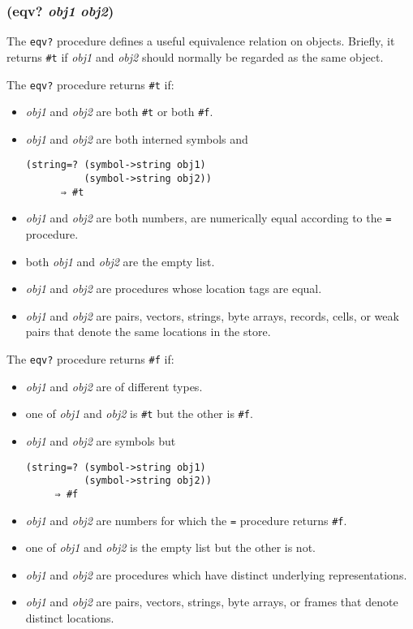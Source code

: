 \documentclass{article}
\begin{document}
\subsubsection{(eqv? \emph{obj1} \emph{obj2})}

The \verb|eqv?| procedure defines a useful equivalence relation on objects. Briefly, it
returns \verb|#t| if \emph{obj1} and \emph{obj2} should normally be regarded as the same
object.

The \verb|eqv?| procedure returns \verb|#t| if:

\begin{itemize}
\item \emph{obj1} and \emph{obj2} are both \verb|#t| or both \verb|#f|.
\item \emph{obj1} and \emph{obj2} are both interned symbols and

\begin{verbatim}
(string=? (symbol->string obj1)
          (symbol->string obj2))
      ⇒ #t
\end{verbatim}
\item \emph{obj1} and \emph{obj2} are both numbers, are numerically equal according to the
  \verb|=| procedure.
\item both \emph{obj1} and \emph{obj2} are the empty list.
\item \emph{obj1} and \emph{obj2} are procedures whose location tags are equal.
\item \emph{obj1} and \emph{obj2} are pairs, vectors, strings, byte arrays, records, cells, or
  weak pairs that denote the same locations in the store.
\end{itemize}

The \verb|eqv?| procedure returns \verb|#f| if:

\begin{itemize}
\item \emph{obj1} and \emph{obj2} are of different types.
\item one of \emph{obj1} and \emph{obj2} is \verb|#t| but the other is \verb|#f|.
\item \emph{obj1} and \emph{obj2} are symbols but

\begin{verbatim}
(string=? (symbol->string obj1)
          (symbol->string obj2))
     ⇒ #f
\end{verbatim}
\item \emph{obj1} and \emph{obj2} are numbers for which the \verb|=| procedure returns
  \verb|#f|.
\item one of \emph{obj1} and \emph{obj2} is the empty list but the other is not.
\item \emph{obj1} and \emph{obj2} are procedures which have distinct underlying
  representations.
\item \emph{obj1} and \emph{obj2} are pairs, vectors, strings, byte arrays, or frames that
  denote distinct locations.
\end{itemize}
\end{document}

